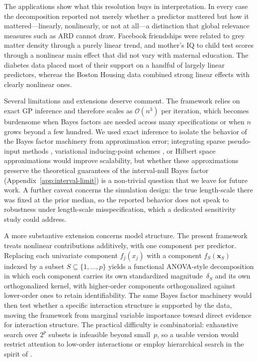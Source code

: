 \documentclass{article}
\begin{document}
The applications show what this resolution buys in interpretation. In
every case the decomposition reported not merely whether a predictor
mattered but how it mattered---linearly, nonlinearly, or not at
all---a distinction that global relevance measures such as ARD cannot
draw. Facebook friendships were related to grey matter density through a
purely linear trend, and mother's IQ to child test scores through a
nonlinear main effect that did not vary with maternal education. The
diabetes data placed most of their support on a handful of largely
linear predictors, whereas the Boston Housing data combined strong
linear effects with clearly nonlinear ones.

Several limitations and extensions deserve comment. The framework relies
on exact GP inference and therefore scales as $\mathcal{O}(n^3)$ per
iteration, which becomes burdensome when Bayes factors are needed across
many specifications or when $n$ grows beyond a few hundred. We used
exact inference to isolate the behavior of the Bayes factor machinery
from approximation error; integrating sparse pseudo-input methods
\parencite{snelson2006sparse, quinoneroCandela2005unifying},
variational inducing-point schemes \parencite{titsias2009variational,
hensman2013gaussian}, or Hilbert space approximations
\parencite{riutortMayol2023hsgp} would improve scalability, but whether
these approximations preserve the theoretical guarantees of the
interval-null Bayes factor (Appendix~\ref{app:interval-limit}) is a
non-trivial question that we leave for future work. A further caveat
concerns the simulation design: the true length-scale there was fixed at
the prior median, so the reported behavior does not speak to robustness
under length-scale misspecification, which a dedicated sensitivity study
could address.

A more substantive extension concerns model structure. The present
framework treats nonlinear contributions additively, with one component
per predictor. Replacing each univariate component $f_j(x_j)$ with a
component $f_S(\mathbf{x}_S)$ indexed by a subset
$S \subseteq \{1,\dots,p\}$ yields a functional ANOVA-style decomposition
in which each component carries its own standardized magnitude~$\delta_S$
and its own orthogonalized kernel, with higher-order components
orthogonalized against lower-order ones to retain identifiability. The same Bayes factor
machinery would then test whether a specific interaction structure is
supported by the data, moving the framework from marginal variable
importance toward direct evidence for interaction structure. The
practical difficulty is combinatorial: exhaustive search over $2^p$
subsets is infeasible beyond small~$p$, so a usable version would
restrict attention to low-order interactions or employ hierarchical
search in the spirit of \textcite{duvenaud2013structure}.
\end{document}
